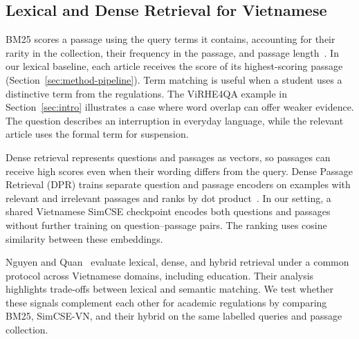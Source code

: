 \subsection{Lexical and Dense Retrieval for Vietnamese}
BM25 scores a passage using the query terms it contains, accounting for
their rarity in the collection, their frequency in the passage, and
passage length~\cite{Robertson_2009}. In our lexical baseline, each
article receives the score of its highest-scoring passage
(Section~\ref{sec:method-pipeline}). Term matching is useful
when a student uses a distinctive term from the regulations. The
ViRHE4QA example in Section~\ref{sec:intro} illustrates a case where
word overlap can offer weaker evidence. The question describes an
interruption in everyday language, while the relevant article uses the
formal term for suspension.

Dense retrieval represents questions and passages as vectors, so passages
can receive high scores even when their wording differs from the query.
Dense Passage Retrieval (DPR) trains separate question and passage
encoders on examples with relevant and irrelevant passages and ranks by
dot product~\cite{karpukhin-etal-2020-dense}. In our setting, a shared
Vietnamese SimCSE checkpoint encodes both questions and passages without
further training on question--passage pairs. The ranking uses cosine
similarity between these embeddings.

Nguyen and Quan~\cite{nguyen-quan-2026-works} evaluate lexical, dense,
and hybrid retrieval under a common protocol across Vietnamese domains,
including education. Their analysis highlights trade-offs between lexical
and semantic matching. We test whether these signals complement each other
for academic regulations by comparing BM25, SimCSE-VN, and their hybrid
on the same labelled queries and passage collection.
